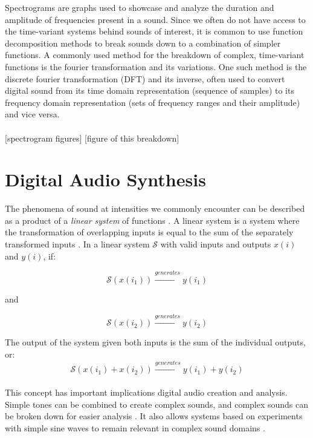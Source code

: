 \documentclass[\main/thesis.tex]{subfiles}
\begin{document}
Spectrograms are graphs used to showcase and analyze the duration and amplitude of frequencies present in a sound. Since we often do not have access to the time-variant systems behind sounds of interest, it is common to use function decomposition methods to break sounds down to a combination of simpler functions. A commonly used method for the breakdown of complex, time-variant functions is the fourier transformation and its variations. One such method is the discrete fourier transformation (DFT) and its inverse, often used to convert digital sound from its time domain representation (sequence of samples) to its frequency domain representation (sets of frequency ranges and their amplitude) and vice versa.\\\\

[spectrogram figures]
[figure of this breakdown]



\section{Digital Audio Synthesis}
\label{sec_digital_synthesis}
The phenomena of sound at intensities we commonly encounter can be described as a product of a \textit{linear system} of functions \cite{cook1999chap4}. A linear system is a system where the transformation of overlapping inputs is equal to the sum of the separately transformed inputs \cite{lyons2004understandingChap1,cook1999chap4}. In a linear system $\mathcal{S}$ with valid inputs and outputs $x(i)$ and $y(i)$, if:

\begin{equation}
 \mathcal{S}(x(i_1)) \xrightarrow{generates} y(i_1)
\end{equation}
\begin{center}
    and
\end{center}
\begin{equation}
\mathcal{S}(x(i_2)) \xrightarrow{generates}y(i_2)
\end{equation}

The output of the system given both inputs is the sum of the individual outputs, or:
\begin{equation}
 \mathcal{S}(x(i_1)+x(i_2)) \xrightarrow{generates} y(i_1)+y(i_2) 
\end{equation}
\\
This concept has important implications digital audio creation and analysis. Simple tones can be combined to create complex sounds, and complex sounds can be broken down for easier analysis \cite{lyons2004understandingChap1}. It also allows systems based on experiments with simple sine waves to remain relevant in complex sound domains \cite{cook1999chap4}.  \\\\
\end{document}
